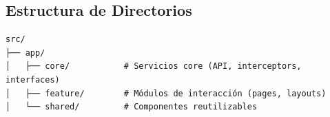 \subsection*{Estructura de Directorios}

\begin{verbatim}
src/
├── app/
│   ├── core/           # Servicios core (API, interceptors, interfaces)
│   ├── feature/        # Módulos de interacción (pages, layouts)
│   └── shared/         # Componentes reutilizables
\end{verbatim}

\newpage

